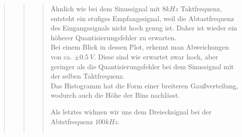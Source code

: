 \begin{quote}
\begin{quote}
\begin{quote}
            Ähnlich wie bei dem Sinussignal mit $8kHz$ Taktfrequenz, entsteht
            ein stufiges Empfangssignal, weil die Abtastfrequenz des
            Eingangssignals nicht hoch genug ist. Daher ist wieder ein höherer
            Quantisierungsfehler zu erwarten.\\
            Bei einem Blick in dessen Plot, erkennt man Abweichungen von ca.
            $\pm 0.5\ V$. Diese sind wie erwartet zwar hoch, aber geringer als
            die Quantisierungsfehler bei dem Sinussignal mit der selben
            Taktfrequenz.\\
            Das Histogramm hat die Form einer breiteren Gaußverteilung, wodurch
            auch die Höhe der Bins nachlässt.
            
            \vspace{1em}
            
            Als letztes widmen wir uns dem Dreiecksignal bei der Abtstfrequenz $100 kHz$.

            \begin{center}
                \begin{tabular}{ll}
                

\end{tabular}
\end{center}
\end{quote}
\end{quote}
\end{quote}
